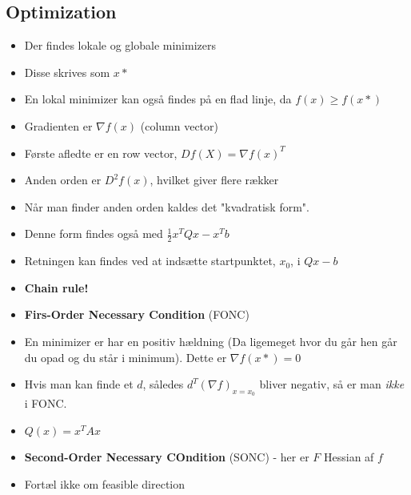\documentclass[danish, 10pt]{Memoir}
\begin{document}
\subsection{Optimization} %
\label{sub:calculus}
\begin{itemize}
	\item Der findes lokale og globale minimizers
	\item Disse skrives som $x*$
	\item En lokal minimizer kan også findes på en flad linje, da $f(x) \geq f(x*)$
	\item Gradienten er $\nabla f(x)$ (column vector)
	\item Første afledte er en row vector, $Df(X) = \nabla f(x)^T$
	\item Anden orden er $D^2f(x)$, hvilket giver flere rækker
	\item Når man finder anden orden kaldes det "kvadratisk form".
	\item[] Denne form findes også med $\frac{1}{2}x^T Qx - x^T b$
	\item Retningen kan findes ved at indsætte startpunktet, $x_0$, i $Qx-b$
	\item \textbf{Chain rule!}
	\item \textbf{Firs-Order Necessary Condition} (FONC)
	\item[] En minimizer er har en positiv hældning (Da ligemeget hvor du går hen går du opad og du står i minimum). Dette er $\nabla f(x*)=0$
	\item Hvis man kan finde et $d$, således $d^T(\nabla f)_ {x=x_0}$ bliver negativ, så er man \emph{ikke} i FONC.
	\item $Q(x) = x^T A x$
	\item \textbf{Second-Order Necessary COndition} (SONC) - her er $F$ Hessian af $f$
	\item Fortæl ikke om feasible direction

\end{itemize}
\end{document}
